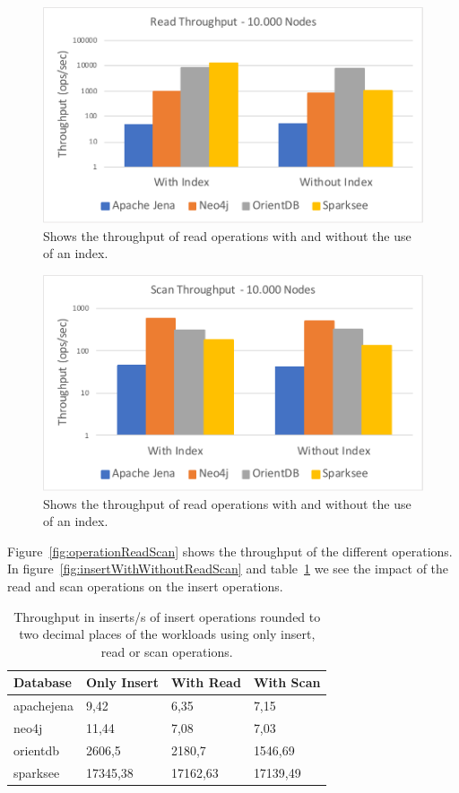 \begin{figure}[h!]
  \centering
  \includegraphics[width=.75\textwidth]{images/responsiveness/readThroughput10000Nodes}
  \caption{Shows the throughput of read operations with and without the use of an index.}
  \label{fig:readThroughput10000Nodes}
\end{figure}

\begin{figure}[h!]
  \centering
  \includegraphics[width=.75\textwidth]{images/responsiveness/scanThroughput10000Nodes}
  \caption{Shows the throughput of read operations with and without the use of an index.}
  \label{fig:scanThroughput10000Nodes}
\end{figure}

Figure~\ref{fig:operationReadScan} shows the throughput of the different operations.
In figure~\ref{fig:insertWithWithoutReadScan} and table~\ref{tab:insertWithWithoutReadScan} we see the impact of the read and scan operations on the insert operations.

\begin{table}[h!]
  \begin{minipage}{\textwidth}
    \centering
    \begin{tabularx}{\textwidth}{ | l | X | X | X | }
      \hline
      Database & Only Insert & With Read & With Scan \\ \hline
      apachejena & 9,42 & 6,35 & 7,15 \\ \hline
      neo4j & 11,44 & 7,08 & 7,03 \\ \hline
      orientdb & 2606,5 & 2180,7 & 1546,69 \\ \hline
      sparksee & 17345,38 & 17162,63 & 17139,49 \\ \hline
    \end{tabularx}
  \end{minipage}
  \caption{Throughput in inserts/s of insert operations rounded to two decimal places of the workloads using only insert, read or scan operations.}
  \label{tab:insertWithWithoutReadScan}
\end{table}

